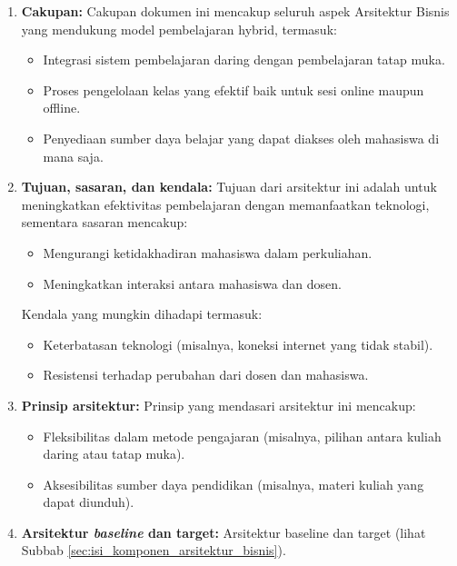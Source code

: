 \begin{enumerate}
	\item \textbf{Cakupan:}  
	Cakupan dokumen ini mencakup seluruh aspek Arsitektur Bisnis yang mendukung model pembelajaran hybrid, termasuk:
	\begin{itemize}
		\item Integrasi sistem pembelajaran daring dengan pembelajaran tatap muka.
		\item Proses pengelolaan kelas yang efektif baik untuk sesi online maupun offline.
		\item Penyediaan sumber daya belajar yang dapat diakses oleh mahasiswa di mana saja.
	\end{itemize}
	
	\item \textbf{Tujuan, sasaran, dan kendala:}  
	Tujuan dari arsitektur ini adalah untuk meningkatkan efektivitas pembelajaran dengan memanfaatkan teknologi, sementara sasaran mencakup:
	\begin{itemize}
		\item Mengurangi ketidakhadiran mahasiswa dalam perkuliahan.
		\item Meningkatkan interaksi antara mahasiswa dan dosen.
	\end{itemize}
	Kendala yang mungkin dihadapi termasuk:
	\begin{itemize}
		\item Keterbatasan teknologi (misalnya, koneksi internet yang tidak stabil).
		\item Resistensi terhadap perubahan dari dosen dan mahasiswa.
	\end{itemize}
	
	\item \textbf{Prinsip arsitektur:}  
	Prinsip yang mendasari arsitektur ini mencakup:
	\begin{itemize}
		\item Fleksibilitas dalam metode pengajaran (misalnya, pilihan antara kuliah daring atau tatap muka).
		\item Aksesibilitas sumber daya pendidikan (misalnya, materi kuliah yang dapat diunduh).
	\end{itemize}
	
	\item \textbf{Arsitektur \textit{baseline} dan target:}  
	Arsitektur baseline dan target (lihat Subbab \ref{sec:isi_komponen_arsitektur_bisnis}).
	

\end{enumerate}
